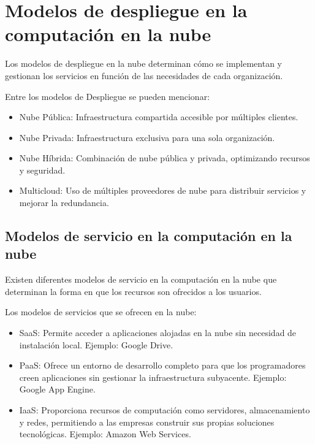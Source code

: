 {    \section[Modelos de despliegue]{Modelos de despliegue en la computaci{\'o}n en la nube}
        Los modelos de despliegue en la nube determinan c{\'o}mo se implementan y gestionan los servicios en funci{\'o}n de las necesidades de cada organizaci{\'o}n.
        
        Entre los modelos de Despliegue se pueden mencionar:
            
        \begin{itemize}
            \item Nube P{\'u}blica: Infraestructura compartida accesible por m{\'u}ltiples clientes.
            \item Nube Privada: Infraestructura exclusiva para una sola organizaci{\'o}n.
            \item Nube H{\'i}brida: Combinaci{\'o}n de nube p{\'u}blica y privada, optimizando recursos y seguridad.
            \item Multicloud: Uso de m{\'u}ltiples proveedores de nube para distribuir servicios y mejorar la redundancia.
        \end{itemize}
        
        \subsection[Modelos de servicios]{Modelos de servicio en la computaci{\'o}n en la nube}
            Existen diferentes modelos de servicio en la computaci{\'o}n en la nube que determinan la forma en que los recursos son ofrecidos a los usuarios.
            
            Los modelos de servicios que se ofrecen en la nube:

            \begin{itemize}
                \item SaaS: Permite acceder a aplicaciones alojadas en la nube sin necesidad de instalaci{\'o}n local. Ejemplo: Google Drive.
                \item PaaS: Ofrece un entorno de desarrollo completo para que los programadores creen aplicaciones sin gestionar la infraestructura subyacente. Ejemplo: Google App Engine.
                \item IaaS: Proporciona recursos de computaci{\'o}n como servidores, almacenamiento y redes, permitiendo a las empresas construir sus propias soluciones tecnol{\'o}gicas. Ejemplo: Amazon Web Services.
            \end{itemize}
            
}
